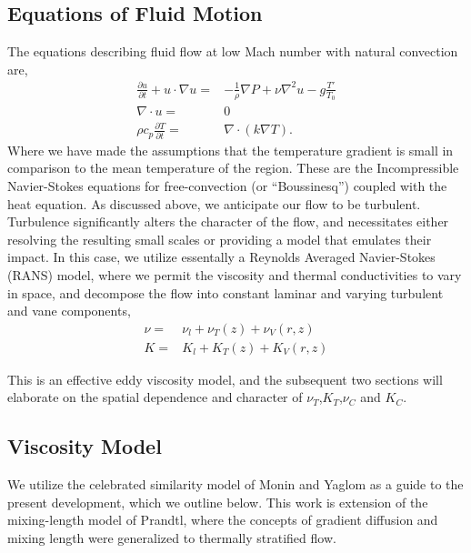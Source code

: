 \subsection{Equations of Fluid Motion}
%
%

The equations describing fluid flow at
low Mach number with natural convection are, 
\begin{eqnarray*}
 \frac{\partial u}{\partial t} + u \cdot \nabla u =&
  -\frac{1}{\rho}\nabla P + \nu \nabla^2 u - g \frac{T'}{T_0}\\
 \nabla \cdot u =& 0 \\
 \rho c_p \frac{\partial T}{\partial t} =& \nabla \cdot ( k \nabla T).
\end{eqnarray*} 
Where we have made the assumptions that the temperature gradient is small in
comparison to the mean temperature of the region. These are the
Incompressible Navier-Stokes equations for free-convection (or
``Boussinesq'') coupled with the heat equation. 
%
%
%
As discussed above, we anticipate our flow to be
turbulent. Turbulence significantly alters the character of the flow,
and necessitates either resolving the resulting small scales or
providing a model that emulates their impact. In this case, we utilize 
essentally a Reynolds Averaged Navier-Stokes (RANS) model, where we
permit the viscosity and thermal conductivities to vary in space, and
decompose the flow into constant laminar and varying turbulent and vane
components,  
\begin{eqnarray*}
 \nu =& \nu_{l} + \nu_{T}(z) + \nu_{V}(r,z) \\
 K =& K_{l} + K_{T}(z) + K_{V}(r,z)
\end{eqnarray*}

This is an effective eddy viscosity model, and the subsequent two
sections will elaborate on the spatial dependence and character of
$\nu_T$,$K_T$,$\nu_C$ and $K_C$. 

\subsection{Viscosity Model}

We utilize the celebrated similarity model of Monin and
Yaglom\cite{monin2007statistical,monin1954basic} as a guide to the
present development, which we outline below. This work is extension of
the mixing-length model of Prandtl, where the concepts of gradient
diffusion and mixing length were generalized to thermally stratified
flow.   

